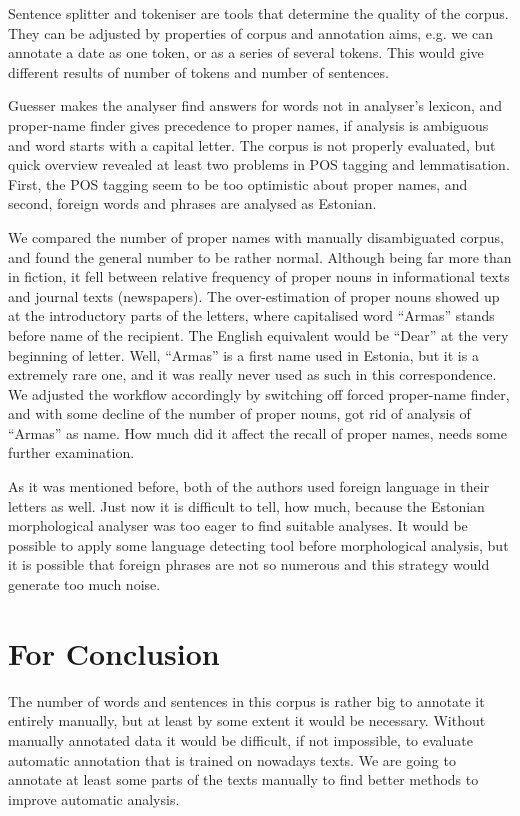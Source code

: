 \documentclass[runningheads]{llncs}
\begin{document}
Sentence splitter and tokeniser are tools that determine the quality of the corpus.
They can be adjusted by properties of corpus and annotation aims, e.g. we can annotate a date as one token, or as a series of several tokens.  This would give different results of number of tokens and number of sentences.


Guesser makes the analyser find answers for words not in analyser's lexicon, and proper-name finder gives precedence to proper names, if analysis is ambiguous and word starts with a capital letter.  The corpus is not properly evaluated, but quick overview revealed at least two problems in POS tagging and lemmatisation.  First, the POS tagging seem to be too optimistic about proper names, and second, foreign words and phrases are analysed as Estonian.

We compared the number of proper names with manually disambiguated corpus, and found the general number to be rather normal.  Although being far more than in fiction, it fell between relative frequency of proper nouns in informational texts and journal texts (newspapers).  The over-estimation of proper nouns showed up at the introductory parts of the letters, where capitalised word ``Armas'' stands before name of the recipient.  The English equivalent would be ``Dear'' at the very beginning of letter.  Well, ``Armas'' is a first name used in Estonia, but it is a extremely rare one, and it was really never used as such in this correspondence.  We adjusted the workflow accordingly by switching off forced proper-name finder, and with some decline of the number of proper nouns, got rid of analysis of ``Armas'' as name.  How much did it affect the recall of proper names, needs some further examination.

As it was mentioned before, both of the authors used foreign language in their letters as well.  Just now it is difficult to tell, how much, because the Estonian morphological analyser was too eager to find suitable analyses.  It would be possible to apply some language detecting tool before morphological analysis, but it is possible that foreign phrases are not so numerous and this strategy would generate too much noise.


\section{For Conclusion}

The number of words and sentences in this corpus is rather big to annotate it entirely manually, but at least by some extent it would be necessary.  Without manually annotated data it would be difficult, if not impossible, to evaluate automatic annotation that is trained on nowadays texts.  We are going to annotate at least some parts of the texts manually to find better methods to improve automatic analysis.
\end{document}
